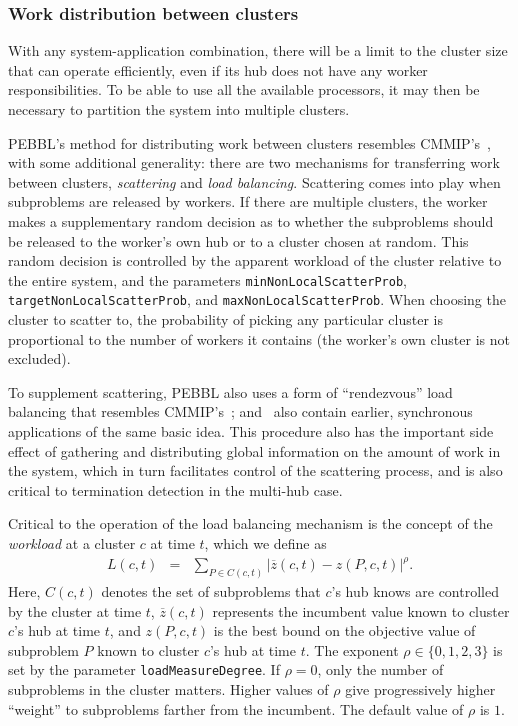 \subsubsection{Work distribution between clusters}
\label{sec:betweenclusters}
With any system-application combination, there will be a limit to the
cluster size that can operate efficiently, even if its hub does
not have any worker responsibilities.  To be able to use
all the available processors, it may then be necessary to partition
the system into multiple clusters.

PEBBL's method for distributing work between clusters resembles
CMMIP's~\cite{Eck94,Eck97}, with some additional generality: there are
two mechanisms for transferring work between clusters,
\emph{scattering} and \emph{load balancing}.  Scattering comes into
play when subproblems are released by workers.  If there are multiple
clusters, the worker makes a supplementary random decision as to
whether the subproblems should be released to the worker's own hub or
to a cluster chosen at random.  This random decision is controlled by
the apparent workload of the cluster relative to the entire system,
and the parameters \texttt{minNonLocalScatterProb},
\texttt{targetNonLocalScatterProb}, and
\texttt{maxNonLocalScatterProb}.  When choosing the cluster to scatter
to, the probability of picking any particular cluster is proportional
to the number of workers it contains (the worker's own cluster is
not excluded).

To supplement scattering, PEBBL also uses a form of ``rendezvous''
load balancing that resembles CMMIP's~\cite{Eck97};
\cite{MD93} and~\cite{KK92} also contain earlier, synchronous
applications of the same basic idea.  This procedure also has the
important side effect of gathering and distributing global information
on the amount of work in the system, which in turn facilitates control
of the scattering process, and is also critical to termination
detection in the multi-hub case.

Critical to the operation of the load balancing mechanism is the
concept of the \emph{workload} at a cluster $c$ at time $t$, which we
define as
\begin{eqnarray}
L(c,t) & = &\sum_{P \in C(c,t)} \!\!\!
{ \left| \overline{z}(c,t) - z(P,c,t) \right| }^{\rho}.
\label{loadcalc}
\end{eqnarray}
Here, $C(c,t)$ denotes the set of subproblems that $c$'s hub knows are
controlled by the cluster at time $t$, $\overline{z}(c,t)$ represents the
incumbent value known to cluster $c$'s hub at time $t$, and $z(P,c,t)$
is the best bound on the objective value of subproblem $P$ known to cluster
$c$'s hub at time $t$.  The exponent $\rho \in \{0, 1, 2, 3\}$
is set by the parameter \texttt{loadMeasureDegree}.  If $\rho=0$,
only the number of subproblems in the cluster matters.  Higher values of
$\rho$ give progressively higher ``weight'' to subproblems
farther from the incumbent.  The default value of $\rho$ is $1$.


